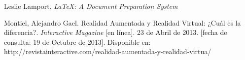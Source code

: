 \documentclass[11pt]{article} %
\begin{document}
\begin{thebibliography}{9}
 Leslie Lamport, \emph{\LaTeX: A Document Preparation System}
 
 Montiel, Alejandro Gael. Realidad Aumentada y Realidad Virtual: ¿Cuál es la diferencia?. \emph{Interactive Magazine} [en línea]. 23 de Abril de 2013.
 [fecha de consulta: 19 de Octubre de 2013]. Disponible en: http://revistainteractive.com/realidad-aumentada-y-realidad-virtua/
\end{thebibliography}
\end{document}
